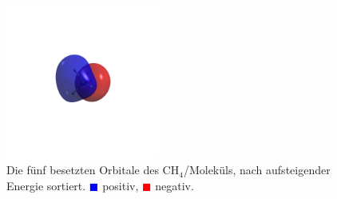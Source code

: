 \begin{enumerate}
\begin{figure}[H]
\includegraphics[trim=1200 1200 1200 1200, clip, width=0.45\textwidth]{res/CH4/ch4_w4.png}
\caption{Die fünf besetzten Orbitale des CH$_4$\-/Moleküls,
nach aufsteigender Energie sortiert.
\textcolor{blue}{$\blacksquare$} positiv,
\textcolor{red}{$\blacksquare$} negativ.}\label{ch4_orbitals}
\end{figure}

\end{enumerate}